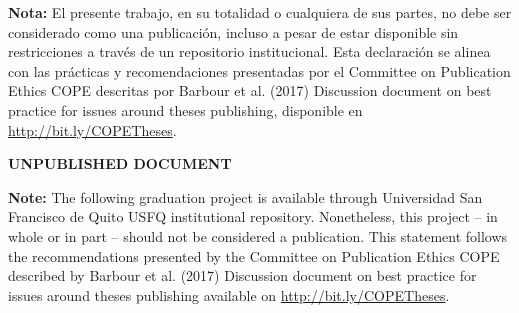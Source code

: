 \fontsize{12}{14}\selectfont \textbf{Nota:} El presente trabajo, en su totalidad o cualquiera de sus partes, no debe ser considerado como una publicación, incluso a pesar de estar disponible sin restricciones a través de un repositorio institucional. Esta declaración se alinea con las prácticas y recomendaciones presentadas por el Committee on Publication Ethics COPE descritas por Barbour et al. (2017) Discussion document on best practice for issues around theses publishing, disponible en \url{http://bit.ly/COPETheses}.
\vspace{10pt}
\begin{center}
    \textbf{\fontsize{14}{16}\selectfont UNPUBLISHED DOCUMENT}\\
\end{center}
\vspace{10pt}
\fontsize{12}{14}\selectfont \textbf{Note:} The following graduation project is available through Universidad San Francisco de Quito USFQ institutional repository. Nonetheless, this project -- in whole or in part -- should not be considered a publication. This statement follows the recommendations presented by the Committee on Publication Ethics COPE described by Barbour et al. (2017) Discussion document on best practice for issues around theses publishing available on \url{http://bit.ly/COPETheses}.
